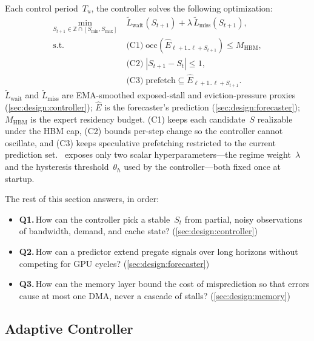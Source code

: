 Each control period~$T_u$, the controller solves the following
optimization:
\begin{equation}
\label{eq:formulation}
\begin{aligned}
\min_{S_{t+1}\in\mathbb{Z}\cap[S_{\min},S_{\max}]} \;
   & \tilde{L}_{\text{wait}}(S_{t+1}) + \lambda\,\tilde{L}_{\text{miss}}(S_{t+1}), \\[-1pt]
\text{s.t.}\quad
   & \text{(C1)}\;\mathrm{occ}(\hat{E}_{\ell+1..\ell+S_{t+1}})\le M_{\text{HBM}}, \\[-1pt]
   & \text{(C2)}\;|S_{t+1}-S_t|\le 1, \\[-1pt]
   & \text{(C3)}\;\text{prefetch}\subseteq\hat{E}_{\ell+1..\ell+S_{t+1}}.
\end{aligned}
\end{equation}
$\tilde{L}_{\text{wait}}$ and $\tilde{L}_{\text{miss}}$ are
EMA-smoothed exposed-stall and eviction-pressure proxies
(\autoref{sec:design:controller}); $\hat{E}$ is the forecaster's
prediction (\autoref{sec:design:forecaster}); $M_{\text{HBM}}$ is the
expert residency budget. (C1) keeps each candidate~$S$ realizable
under the HBM cap, (C2) bounds per-step change so the controller
cannot oscillate, and (C3) keeps speculative prefetching restricted
to the current prediction set. \systemname\ exposes only two scalar
hyperparameters---the regime weight~$\lambda$ and the hysteresis
threshold~$\theta_h$ used by the controller---both fixed once at
startup.

The rest of this section answers, in order:
\begin{itemize}[leftmargin=1.4em, itemsep=2pt, topsep=2pt]
    \item \textbf{Q1.}\,How can the controller pick a stable~$S_t$ from
    partial, noisy observations of bandwidth, demand, and cache state?
    (\autoref{sec:design:controller})
    \item \textbf{Q2.}\,How can a predictor extend pregate signals over
    long horizons without competing for GPU cycles?
    (\autoref{sec:design:forecaster})
    \item \textbf{Q3.}\,How can the memory layer bound the cost of
    misprediction so that errors cause at most one DMA, never a
    cascade of stalls? (\autoref{sec:design:memory})
\end{itemize}

\subsection{Adaptive Controller}
\label{sec:design:controller}

